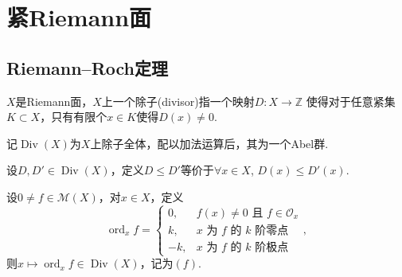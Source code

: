 
\newcommand{\bbC}{\mathbb{C}}
\newcommand{\calO}{\mathcal{O}}
\newcommand{\calE}{\mathcal{E}}
\newcommand{\calF}{\mathcal{F}}
\newcommand{\scrH}{\mathscr{H}}
\newcommand{\scrL}{\mathscr{L}}
\newcommand{\scrU}{\mathscr{U}}
\newcommand{\id}{\operatorname{id}}
\newcommand{\Ima}{\operatorname{Im}}
\newcommand{\Ker}{\operatorname{Ker}}
\newcommand{\Res}{\operatorname{Res}}
\newcommand{\Supp}{\operatorname{Supp}}
\newcommand{\ord}{\operatorname{ord}}
\newcommand{\Div}{\operatorname{Div}}
\newcommand{\Reg}{\operatorname{Reg}}
\renewcommand{\Re}{\operatorname{Re}}
\renewcommand{\Im}{\operatorname{Im}}
\newcommand{\Opartial}{\overline{\partial}}
\newcommand{\varep}{\varepsilon}
\newcommand{\Over}{\overline}



\section{紧Riemann面}
	
\subsection{Riemann--Roch定理}
\begin{definition}
	$X$是Riemann面，$X$上一个除子(divisor)指一个映射$D\colon X\rightarrow \mathbb{Z}$
    使得对于任意紧集$K\subset X$，只有有限个$x\in K$使得$D(x)\neq 0$.
			
	记$\Div(X)$为$X$上除子全体，配以加法运算后，其为一个Abel群.
			
	设$D, D'\in \Div(X)$，定义$D\leq D'$等价于$\forall x\in X$, $D(x)\leq D'(x)$.
\end{definition}	
		
\begin{example}
	设$0\neq f\in \mathscr{M}(X)$，对$x\in X$，定义
	$$\ord_xf= \begin{cases} 0, &f(x)\neq 0\text{ 且 } f\in \mathcal{O}_x\\
	k, &x\text{ 为 }f\text{ 的 }k\text{ 阶零点}\\
	-k, &x\text{ 为 }f\text{ 的 }k\text{ 阶极点}
	\end{cases},$$
	则$x\mapsto \ord_xf \in \Div(X)$，记为$(f)$.
\end{example}
		
